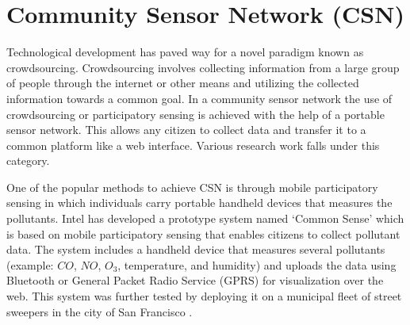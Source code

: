 \section{Community Sensor Network (CSN)}



Technological development has paved way for a novel paradigm known as crowdsourcing. Crowdsourcing involves collecting information from a large group of people through the internet or other means and utilizing the collected information towards a common goal. In a community sensor network the use of crowdsourcing or participatory sensing is achieved with the help of a portable sensor network. This allows any citizen to collect data and transfer it to a common platform like a web interface. Various research work falls under this category.
 


 \par
One of the popular methods to achieve CSN is through mobile participatory sensing in which individuals carry portable handheld devices that measures the pollutants. Intel has developed a prototype system named \lq{Common Sense}\rq \cite{Dutta2009} which is based on mobile participatory sensing that enables citizens to collect pollutant data. The system includes a handheld device that measures several pollutants (example: $CO$, $NO$, $O_{3}$, temperature, and humidity) and uploads the data using Bluetooth or General Packet Radio Service (GPRS) for visualization over the web. This system was further tested by deploying it on a municipal fleet of street sweepers in the city of San Francisco \cite{Aoki2008}. 

